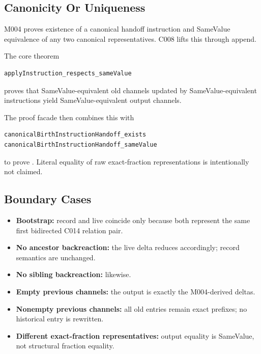 \subsection{Canonicity Or Uniqueness}\label{canonicity-or-uniqueness-10}

M004 proves existence of a canonical handoff instruction and SameValue
equivalence of any two canonical representatives. C008 lifts this
through append.

The core theorem

\begin{verbatim}
applyInstruction_respects_sameValue
\end{verbatim}

proves that SameValue-equivalent old channels updated by
SameValue-equivalent instructions yield SameValue-equivalent output
channels.

The proof facade then combines this with

\begin{verbatim}
canonicalBirthInstructionHandoff_exists
canonicalBirthInstructionHandoff_sameValue
\end{verbatim}

to prove \texttt{\protect{}}. Literal equality of
raw exact-fraction representations is intentionally not claimed.

\subsection{Boundary Cases}\label{boundary-cases-10}

\begin{itemize}
\tightlist
\item
  \textbf{Bootstrap:} record and live coincide only because both
  represent the same first bidirected C014 relation pair.
\item
  \textbf{No ancestor backreaction:} the live delta reduces accordingly;
  record semantics are unchanged.
\item
  \textbf{No sibling backreaction:} likewise.
\item
  \textbf{Empty previous channels:} the output is exactly the
  M004-derived deltas.
\item
  \textbf{Nonempty previous channels:} all old entries remain exact
  prefixes; no historical entry is rewritten.
\item
  \textbf{Different exact-fraction representatives:} output equality is
  SameValue, not structural fraction equality.
\end{itemize}

